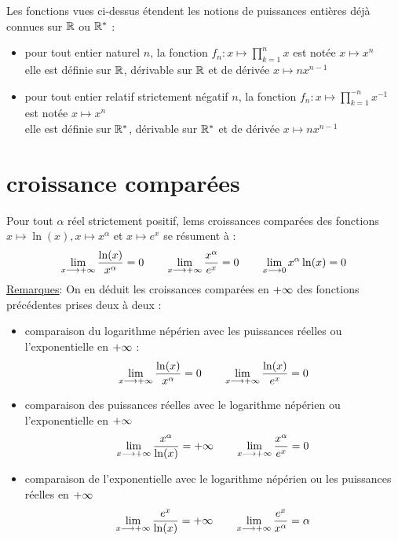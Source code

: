 \begin{defprop}
    Les fonctions vues ci-dessus étendent les notions de puissances entières déjà connues sur \(\mathbb{R}\) ou \(\mathbb{R}^*\) :
    \begin{itemize}
        \item pour tout entier naturel \(n\), la fonction \(f_n : x\mapsto \prod_{k=1}^{n}x\) est notée \(x\mapsto x^n\)\\
        elle est définie sur \(\mathbb{R}\), dérivable sur \(\mathbb{R}\) et de dérivée \(x\mapsto nx^{n-1}\)
        \item pour tout entier relatif strictement négatif \(n\), la fonction \(f_n : x\mapsto \prod_{k=1}^{-n}x^{-1}\) est notée \(x\mapsto x^n\)\\
        elle est définie sur \(\mathbb{R}^*\), dérivable sur \(\mathbb{R}^*\) et de dérivée \(x\mapsto nx^{n-1}\)
    \end{itemize}
\end{defprop}

\section{croissance comparées}
\begin{defprop}
    Pour tout \(\alpha\) réel strictement positif, lems croissances comparées des fonctions \(x \mapsto \ln (x), x \mapsto x^{\alpha}\) et \(x \mapsto e^x\) se résument à : 
    \[\lim_{x\longrightarrow+\infty} \frac{\ln(x)}{x^{\alpha}} = 0 \qquad \lim_{x\longrightarrow+\infty} \frac{x^{\alpha}}{e^x} = 0 \qquad \lim_{x\longrightarrow 0} x^{\alpha} \ln(x) = 0\]
    \underline{Remarques}:
    On en déduit les croissances comparées en \(+\infty\) des fonctions précédentes prises deux à deux :
    \begin{itemize}
        \item comparaison du logarithme népérien avec les puissances réelles ou l’exponentielle en \(+\infty\) :
        \[\lim_{x\longrightarrow+\infty} \frac{\ln(x)}{x^{\alpha}} = 0 \qquad \lim_{x\longrightarrow+\infty} \frac{\ln(x)}{e^x} = 0\]
        \item comparaison des puissances réelles avec le logarithme népérien ou l’exponentielle en \(+\infty\)
        \[\lim_{x\longrightarrow+\infty} \frac{x^{\alpha}}{\ln(x)} = +\infty \qquad \lim_{x\longrightarrow+\infty} \frac{x^{\alpha}}{e^x} = 0\]
        \item comparaison de l’exponentielle avec le logarithme népérien ou les puissances réelles en \(+\infty\)
        \[\lim_{x\longrightarrow+\infty} \frac{e^x}{\ln(x)} = +\infty \qquad \lim_{x\longrightarrow+\infty} \frac{e^x}{x^{\alpha}} = \alpha\]
    
    \end{itemize}
\end{defprop}

